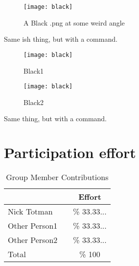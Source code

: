 \documentclass{article}
\begin{document}
\begin{figure}[H]%
\centering
\texttt{[image: black]}
\caption{A Black .png at some weird angle}
\end{figure}

Same ish thing, but with a command.

\begin{figure}[H]
  \centering
  \begin{minipage}[b]{0.45\textwidth}
    \texttt{[image: black]}
    \caption{Black1}
  \end{minipage}
  \hfill
  \begin{minipage}[b]{0.45\textwidth}
    \texttt{[image: black]}
    \caption{Black2}
  \end{minipage}
\end{figure}

Same thing, but with a command.

\section{Participation effort}

\begin{table}[H]
	\renewcommand\arraystretch{1.2}
	\caption{Group Member Contributions}
	\begin{center}
		\begin{tabular}{lc | c}
			\toprule
			& \hspace{1in} & Effort	\\
			\hline 				
			Nick Totman		&& 	\%	33.33...	\\
			Other Person1  		&& 	\%	33.33...	\\
			Other Person2		&& 	\%	33.33...	\\

			\bottomrule
			Total				&& \% 100
		\end{tabular}
	\end{center}
	\label{default}
\end{table}

\pagebreak



\end{document}

